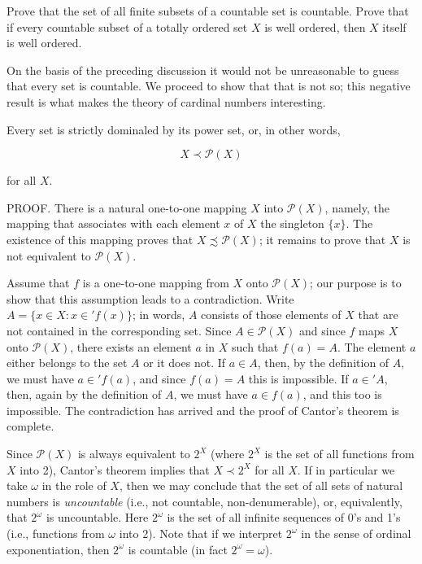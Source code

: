 \begin{named}[EXERCISE. ] Prove that the set of all finite subsets of a countable set is countable. Prove that if every countable subset of a totally ordered set $X$ is well ordered, then $X$ itself is well ordered. 
\end{named}

On the basis of the preceding discussion it would not be unreasonable to guess that every set is countable. We proceed to show that that is not so; this negative result is what makes the theory of cardinal numbers interesting.

\begin{named} Every set is strictly dominaled by its power set, or, in other words, 

\begin{equation*}
X \prec \mathcal{P}(X)
\end{equation*}

for all $X$. 
\end{named}

PROOF. There is a natural one-to-one mapping $X$ into $\mathcal{P}(X)$, namely, the mapping that associates with each element $x$ of $X$ the singleton $\{ x \}$. The existence of this mapping proves that $X \precsim \mathcal{P}(X)$; it remains to prove that $X$ is not equivalent to $\mathcal{P}(X)$. 

Assume that $f$ is a one-to-one mapping from $X$ onto $\mathcal{P}(X)$; our purpose is to show that this assumption  leads to a contradiction. Write $A = \{ x \in X: x \in ' f(x) \}$; in words, $A$ consists of those elements of $X$ that are not contained in the corresponding set. Since $A \in \mathcal{P}(X)$ and since $f$ maps $X$ onto $\mathcal{P}(X)$, there exists an element $a$ in $X$ such that $f(a) = A$. The element $a$ either belongs to the set $A$ or it does not. If $a \in A$, then, by the definition of $A$, we must have $a \in ' f(a)$, and since $f(a) = A$ this is impossible. If $a \in ' A$, then, again by the definition of $A$, we must have $a \in f(a)$, and this too is impossible. The contradiction has arrived and the proof of Cantor's theorem is complete.

Since $\mathcal{P}(X)$ is always equivalent to $2^{X}$ (where $2^{X}$ is the set of all functions from $X$ into 2), Cantor's theorem implies that $X \prec 2^{X}$ for all $X$. If in particular we take $\omega$ in the role of $X$, then we may conclude that the set of all sets of natural numbers is \textit{uncountable} (i.e., not countable, non-denumerable), or, equivalently, that $2^{\omega}$ is uncountable. Here $2^{\omega}$ is the set of all infinite sequences of 0's and 1's (i.e., functions from $\omega$ into 2). Note that if we interpret $2^{\omega}$ in the sense of ordinal exponentiation, then $2^{\omega}$ is countable (in fact $2^{\omega} = \omega$).